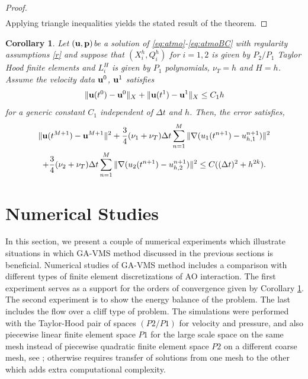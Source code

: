 \documentclass[10pt]{article}%
\numberwithin{equation}{section}
\newtheorem{cor}{Corollary}[section]
\newcommand{\bu}{{\bf u}}
\begin{document}
\begin{proof}
\begin{eqnarray}
	\end{eqnarray}
	Applying triangle inequalities yields the stated result of the theorem.
	
\end{proof}

\begin{cor} \label{corr}
Let $(\bu,{\bf p})$be a solution of \eqref{eq:atmo}-\eqref{eq:atmoBC} with regularity assumptions \eqref{r} and suppose that $(X_i^h,Q_i^h)$ for $i=1,2$ is given by $P_2/P_1$ Taylor Hood finite elements and $L_i^H$ is given by $P_1$ polynomials, $\nu_T=h$ and $H=h$. Assume the velocity data
$\bu^0$, $\bu^1$ satisfies $$\|\bu(t^0)-\bu^0\|_X+\|\bu(t^1)-\bu^1\|_X \leq C_1h$$
for a generic constant $C_1$ independent of $\Delta t$ and $h$. Then, the error satisfies,
\begin{gather}
\|{\bf u}(t^{{M}+1})-{\bf u}^{{M}+1}\|^2  +{ \frac{3}{4}(\nu_1+\nu_T)\Delta t\sum_{n=1}^{M}\|\nabla  (u_1(t^{n+1})-u_{h,1}^{n+1})\|^2}\nonumber
\\
+\frac{3}{4}(\nu_2+\nu_T)\Delta t\sum_{n=1}^{M}\|\nabla  (u_2(t^{n+1})-u_{h,2}^{n+1})\|^2
\leq C((\Delta t)^2+h^{2k}).\label{cor}
	\end{gather}
\end{cor}



\section{Numerical Studies}

In this section, we present a couple of numerical experiments which illustrate situations in which GA-VMS method discussed in the previous sections is beneficial. Numerical studies of GA-VMS method includes a comparison with different types of finite element discretizations of AO interaction. The first experiment serves as a support for the orders of convergence given by Corollary \ref{corr}. The second experiment is to show the energy balance of the problem. The last includes the flow over a cliff type of problem. The simulations were performed with the Taylor-Hood pair of spaces $(P2/P1)$ for velocity and pressure, and also piecewise linear finite element space $P1$ for the large scale space on the same mesh instead of piecewise quadratic finite element space $P2$ on a different coarse mesh, see \cite{jokaya1}; otherwise requires transfer of solutions from one mesh to the other which adds extra computational complexity.
\end{document}
